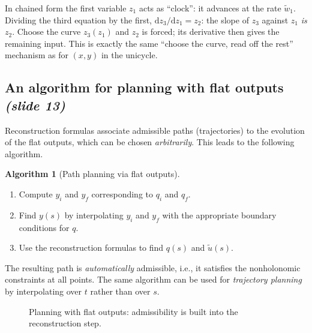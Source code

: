 \documentclass[11pt,a4paper]{article}
\def\boldsymbol#1{#1}%
\newcommand{\dd}{\mathrm{d}}
\newcommand{\q}{\boldsymbol{q}}
\newcommand{\qi}{\boldsymbol{q}_i}
\newcommand{\qf}{\boldsymbol{q}_f}
\newcommand{\ut}{\tilde{\boldsymbol{u}}}
\newcommand{\wwt}{\tilde w}
\theoremstyle{definition}
\newtheorem{algorithm}[definition]{Algorithm}
\theoremstyle{plain}
\theoremstyle{remark}
\begin{document}
\begin{intuition}
In chained form the first variable $z_1$ acts as ``clock'': it advances at the rate $\wwt_1$. Dividing the third equation by
the first, $\dd z_3/\dd z_1=z_2$: the slope of $z_3$ against $z_1$ \emph{is} $z_2$. Choose the curve $z_3(z_1)$ and
$z_2$ is forced; its derivative then gives the remaining input. This is exactly the same ``choose the curve, read off the rest''
mechanism as for $(x,y)$ in the unicycle.
\end{intuition}

\subsection{An algorithm for planning with flat outputs \emph{(slide 13)}}

Reconstruction formulas associate admissible paths (trajectories) to the evolution of the flat outputs, which can be chosen
\emph{arbitrarily}. This leads to the following algorithm.

\begin{algorithm}[Path planning via flat outputs]\label{alg:flat}
\begin{enumerate}[nosep,label=\arabic*.]
\item Compute $\boldsymbol y_i$ and $\boldsymbol y_f$ corresponding to $\qi$ and $\qf$.
\item Find $\boldsymbol y(s)$ by interpolating $\boldsymbol y_i$ and $\boldsymbol y_f$ with the appropriate boundary conditions for $\q$.
\item Use the reconstruction formulas to find $\q(s)$ and $\ut(s)$.
\end{enumerate}
\end{algorithm}

The resulting path is \emph{automatically} admissible, i.e., it satisfies the nonholonomic constraints at all points. The same
algorithm can be used for \emph{trajectory planning} by interpolating over $t$ rather than over $s$.

\begin{figure}[h]
\centering
{}
\caption{Planning with flat outputs: admissibility is built into the reconstruction step.}
\end{figure}
\end{document}
